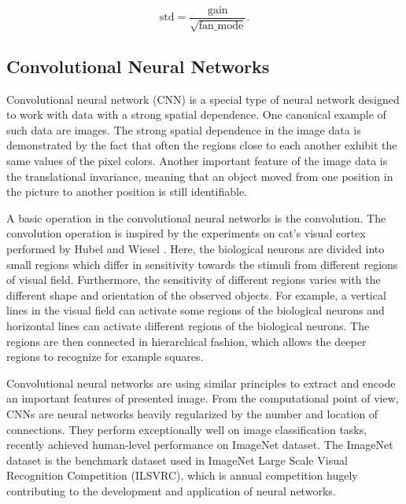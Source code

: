 \begin{equation}
    \text{std} = \frac{\text{gain}}{\sqrt{\text{fan\_mode}}}.
\end{equation}

\subsection{Convolutional Neural Networks}
Convolutional neural network (CNN) is a special type of neural network designed to work with data with a strong spatial dependence.
One canonical example of such data are images.
The strong spatial dependence in the image data is demonstrated by the fact that often the regions close to each another exhibit the same values of the pixel colors.
Another important feature of the image data is the translational invariance, meaning that an object moved from one position in the picture to another position is still identifiable.

A basic operation in the convolutional neural networks is the convolution.
The convolution operation is inspired by the experiments on cat's visual cortex performed by Hubel and Wiesel \cite{hubel1959receptive}.
Here, the biological neurons are divided into small regions which differ in sensitivity towards the stimuli from different regions of visual field.
Furthermore, the sensitivity of different regions varies with the different shape and orientation of the observed objects.
For example, a vertical lines in the visual field can activate some regions of the biological neurons and horizontal lines can activate different regions of the biological neurons.
The regions are then connected in hierarchical fashion, which allows the deeper regions to recognize for example squares.

Convolutional neural networks are using similar principles to extract and encode an important features of presented image.
From the computational point of view, CNNs are neural networks heavily regularized by the number and location of connections.
They perform exceptionally well on image classification tasks, recently achieved human-level performance on ImageNet dataset.
The ImageNet dataset is the benchmark dataset used in ImageNet Large Scale Visual Recognition Competition (ILSVRC), which is annual competition hugely contributing to the development and application of neural networks.

